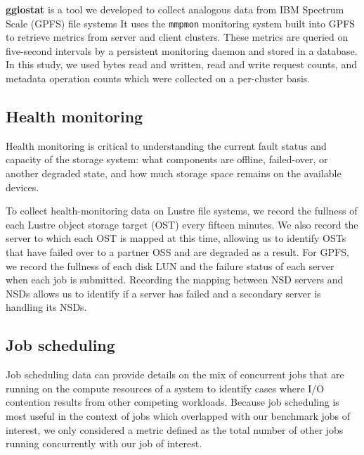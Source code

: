 \label{sec:methods/ggiostat}
\textbf{ggiostat} is a tool we developed 
to collect analogous data from IBM Spectrum Scale (GPFS) file systems %
It uses the \texttt{mmpmon} monitoring system built into GPFS to retrieve metrics from server and client clusters.
These metrics are queried on five-second intervals by a persistent monitoring daemon and stored in a database.
In this study, we used bytes read and written, read and write request counts, and metadata operation counts which were collected on a per-cluster basis.

\subsection{Health monitoring} \label{sec:methods/health}

Health monitoring is critical to understanding the current fault status and capacity of the
storage system: what components are offline, failed-over, or another degraded state, and how much storage space remains on the available devices.

To collect health-monitoring data on Lustre file systems, we record the fullness of each Lustre object storage target (OST) every fifteen minutes.
We also record the server to which each OST is mapped at this time, allowing us to identify OSTs that have failed over to a partner OSS and are degraded as a result.
For GPFS, we record the fullness of each disk LUN and the failure status of each server when each job is submitted.
Recording the mapping between NSD servers and NSDs allows us to identify if a server has failed and a secondary server is handling its NSDs.

\subsection{Job scheduling} \label{sec:methods/scheduling}

Job scheduling data can provide details on the mix of concurrent jobs that are running on the compute resources of a system to identify cases where I/O contention results from other competing workloads.
Because job scheduling is most useful in the context of jobs which overlapped with our benchmark jobs of interest, we only considered a metric defined as the total number of other jobs running concurrently with our job of interest.

